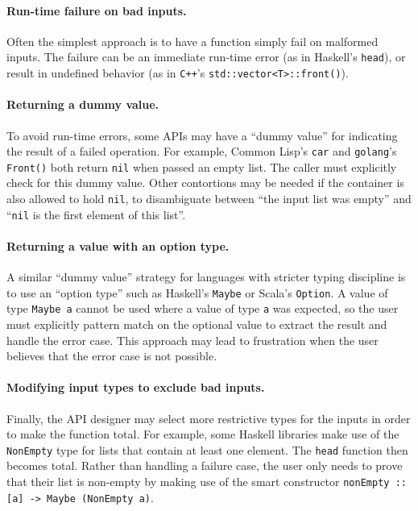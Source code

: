 \documentclass[format=sigplan, review=false, screen=true]{acmart}
\begin{document}
\paragraph{Run-time failure on bad inputs.}
Often the simplest approach is
  to have a function simply fail on malformed inputs. The failure can
  be an immediate run-time error (as in Haskell's \texttt{head}), or result in
  undefined behavior (as in \texttt{C++}'s \texttt{std::vector<T>::front()}).
  
\paragraph{Returning a dummy value.}
  To avoid run-time errors, some APIs may have a ``dummy value''
  for indicating the result of a failed operation. For example, Common Lisp's
  \texttt{car} and \texttt{golang}'s \texttt{Front()} both return \texttt{nil}
  when passed an empty list. The caller must explicitly check for this dummy
  value. Other contortions may be needed if the container is also allowed to
  hold \texttt{nil}, to disambiguate between ``the input list was empty'' and
  ``\texttt{nil} is the first element of this list''.

\paragraph{Returning a value with an option type.}
  A similar ``dummy value'' strategy
  for languages with stricter typing discipline is to use an ``option type'' such
  as Haskell's \texttt{Maybe} or Scala's \texttt{Option}. A value of type \texttt{Maybe a}
  cannot be used where a value of type \texttt{a} was expected, so the user must
  explicitly pattern match on the optional value to extract the result and handle the
  error case. This approach may lead to frustration when the user believes that the
  error case is not possible.
  
\paragraph{Modifying input types to exclude bad inputs.}
Finally, the API designer may select more restrictive types for the inputs in order
to make the function total. For example, some Haskell libraries make use of the
\texttt{NonEmpty} type for lists that contain at least one element. The \texttt{head}
function then becomes total. Rather than handling a failure case, the user only
needs to prove that their list is non-empty by making use of the smart constructor
\texttt{nonEmpty :: [a] -> Maybe (NonEmpty a)}.
\end{document}
